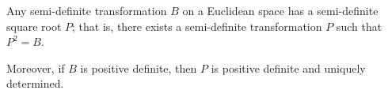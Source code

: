 Any semi-definite transformation $B$ on a Euclidean space has a semi-definite square root $P$; that is, there exists a semi-definite transformation $P$ such that $P^2 = B$.

Moreover, if $B$ is positive definite, then $P$ is positive definite and uniquely determined.
